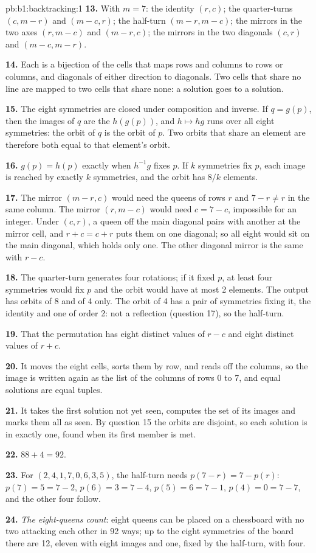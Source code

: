 \begin{solution}{pb:b1:backtracking:1}
\textbf{13.} With $m = 7$: the identity $(r, c)$; the quarter-turns $(c, m - r)$ and $(m - c, r)$; the half-turn $(m - r,
m - c)$; the mirrors in the two axes $(r, m - c)$ and $(m - r, c)$; the mirrors in the two diagonals $(c, r)$ and $(m -
c, m - r)$.

\textbf{14.} Each is a bijection of the cells that maps rows and columns to rows or columns, and diagonals of either
direction to diagonals. Two cells that share no line are mapped to two cells that share none: a solution goes to a
solution.

\textbf{15.} The eight symmetries are closed under composition and inverse. If $q = g(p)$, then the images of $q$ are
the $h(g(p))$, and $h \mapsto hg$ runs over all eight symmetries: the orbit of $q$ is the orbit of $p$. Two orbits that
share an element are therefore both equal to that element's orbit.

\textbf{16.} $g(p) = h(p)$ exactly when $h^{-1}g$ fixes $p$. If $k$ symmetries fix $p$, each image is reached by
exactly $k$ symmetries, and the orbit has $8/k$ elements.

\textbf{17.} The mirror $(m - r, c)$ would need the queens of rows $r$ and $7 - r \neq r$ in the same column. The mirror
$(r, m - c)$ would need $c = 7 - c$, impossible for an integer. Under $(c, r)$, a queen off the main diagonal pairs with
another at the mirror cell, and $r + c = c + r$ puts them on one diagonal; so all eight would sit on the main diagonal,
which holds only one. The other diagonal mirror is the same with $r - c$.

\textbf{18.} The quarter-turn generates four rotations; if it fixed $p$, at least four symmetries would fix $p$ and the
orbit would have at most 2 elements. The output has orbits of 8 and of 4 only. The orbit of 4 has a pair of symmetries
fixing it, the identity and one of order 2: not a reflection (question 17), so the half-turn.

\textbf{19.} That the permutation has eight distinct values of $r - c$ and eight distinct values of $r + c$.

\textbf{20.} It moves the eight cells, sorts them by row, and reads off the columns, so the image is written again as
the list of the columns of rows 0 to 7, and equal solutions are equal tuples.

\textbf{21.} It takes the first solution not yet seen, computes the set of its images and marks them all as seen. By
question 15 the orbits are disjoint, so each solution is in exactly one, found when its first member is met.

\textbf{22.} $88 + 4 = 92$.

\textbf{23.} For $(2, 4, 1, 7, 0, 6, 3, 5)$, the half-turn needs $p(7 - r) = 7 - p(r)$: $p(7) = 5 = 7 - 2$, $p(6) = 3 =
7 - 4$, $p(5) = 6 = 7 - 1$, $p(4) = 0 = 7 - 7$, and the other four follow.

\textbf{24.} \emph{The eight-queens count}: eight queens can be placed on a chessboard with no two attacking each other
in 92 ways; up to the eight symmetries of the board there are 12, eleven with eight images and one, fixed by the
half-turn, with four.
\end{solution}
